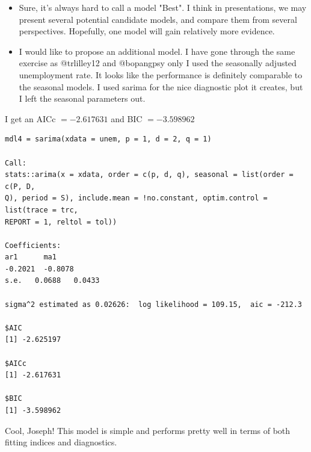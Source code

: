 \begin{itemize}
\item Sure, it's always hard to call a model "Best". I think in presentations, we may present several potential candidate models, and compare them from several perspectives. Hopefully, one model will gain relatively more evidence.

\item I would like to propose an additional model. I have gone through the same exercise as @trlilley12 and @bopangpsy only I used the seasonally adjusted unemployment rate. It looks like the performance is definitely comparable to the seasonal models. I used sarima for the nice diagnostic plot it creates, but I left the seasonal parameters out.

\end{itemize}

I get an AICc \(= -2.617631\) and BIC \(= -3.598962\)

\begin{verbatim}
mdl4 = sarima(xdata = unem, p = 1, d = 2, q = 1)

Call:
stats::arima(x = xdata, order = c(p, d, q), seasonal = list(order = c(P, D, 
Q), period = S), include.mean = !no.constant, optim.control = list(trace = trc, 
REPORT = 1, reltol = tol))

Coefficients:
ar1      ma1
-0.2021  -0.8078
s.e.   0.0688   0.0433

sigma^2 estimated as 0.02626:  log likelihood = 109.15,  aic = -212.3

$AIC
[1] -2.625197

$AICc
[1] -2.617631

$BIC
[1] -3.598962
\end{verbatim}

Cool, Joseph! This model is simple and performs pretty well in terms of both fitting indices and diagnostics.
    

